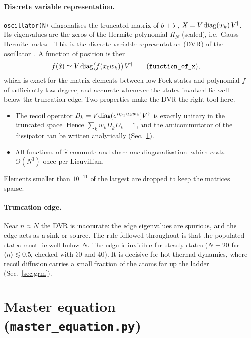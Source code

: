 \documentclass[11pt,a4paper]{article}
\newcommand{\code}[1]{\texttt{#1}}
\begin{document}
\paragraph{Discrete variable representation.} \code{oscillator(N)} diagonalises the truncated matrix of $b+b^\dagger$, $X=V\,{\rm diag}(w_k)\,V^\dagger$. Its eigenvalues are the zeros of the Hermite polynomial $H_N$ (scaled), i.e.\ Gauss--Hermite nodes~\cite{golub1969}. This is the discrete variable representation (DVR) of the oscillator~\cite{light1985}. A function of position is then
\begin{equation}
  f(\hat x)\simeq V\,{\rm diag}\big(f(x_0w_k)\big)\,V^\dagger \qquad(\code{function\_of\_x}),
\end{equation}
which is exact for the matrix elements between low Fock states and polynomial $f$ of sufficiently low degree, and accurate whenever the states involved lie well below the truncation edge. Two properties make the DVR the right tool here.
\begin{itemize}
\item The recoil operator $D_k=V{\rm diag}(e^{i\eta_{\rm sp}u_kw_k})V^\dagger$ is exactly unitary in the truncated space. Hence $\sum_kw_kD_k^\dagger D_k=\mathbb 1$, and the anticommutator of the dissipator can be written analytically (Sec.~\ref{sec:me}).
\item All functions of $\hat x$ commute and share one diagonalisation, which costs $O(N^3)$ once per Liouvillian.
\end{itemize}
Elements smaller than $10^{-11}$ of the largest are dropped to keep the matrices sparse.

\paragraph{Truncation edge.} Near $n\approx N$ the DVR is inaccurate: the edge eigenvalues are spurious, and the edge acts as a sink or source. The rule followed throughout is that the populated states must lie well below $N$. The edge is invisible for steady states ($N=20$ for $\langle n\rangle\lesssim0.5$, checked with 30 and 40). It is decisive for hot thermal dynamics, where recoil diffusion carries a small fraction of the atoms far up the ladder (Sec.~\ref{sec:grm}).

\section{Master equation (\code{master\_equation.py})}
\label{sec:me}
\end{document}
